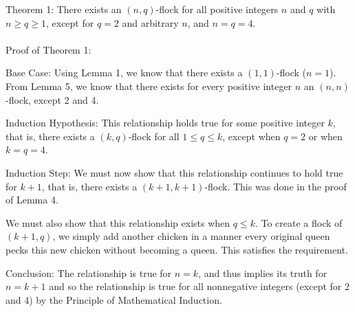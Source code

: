 \documentclass[answers]{exam}
\begin{document}
\begin{questions}
\begin{solution}
            Theorem 1: There exists an $(n,q)$-flock for all positive integers $n$ and $q$ with $n \geq q \geq 1$, except for 
			$q = 2$ and arbitrary $n$, and $n = q = 4$.
            \\\\
            
            Proof of Theorem 1:

            Base Case: Using Lemma 1, we know that there exists a $(1, 1)$-flock ($n=1$). From Lemma 5, we know that there exists for every positive integer $n$ an $(n, n)$-flock, except 2 and 4.

            Induction Hypothesis: This relationship holds true for some positive integer $k$, that is, there exists a $(k, q)$-flock for all $1 \leq q \leq k$, except when $q=2$ or when $k=q=4$.

            Induction Step: We must now show that this relationship continues to hold true for $k + 1$, that is, there exists a $(k+1, k+1)$-flock. This was done in the proof of Lemma 4.

            We must also show that this relationship exists when $q \leq k$. To create a flock of $(k+1, q)$, we simply add another chicken in a manner every original queen pecks this new chicken without becoming a queen. This satisfies the requirement.

            Conclusion: The relationship is true for $n = k$, and thus implies its truth for $n = k + 1$ and so the relationship is true for all nonnegative integers (except for 2 and 4) by the Principle of Mathematical Induction.
            
		\end{solution}
		
	
		
	
	\end{questions}
	
	
\end{document}
